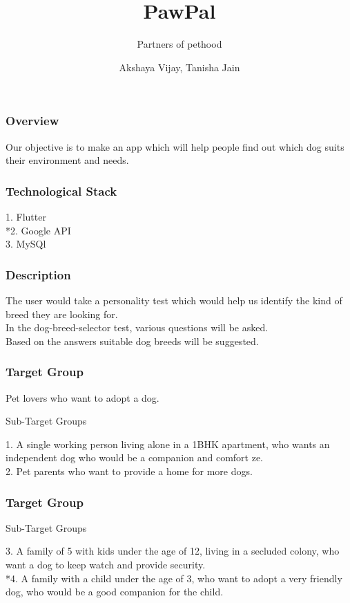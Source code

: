 \documentclass[14pt]{beamer}
\title[Pawpal]{PawPal}
\subtitle[Partners of pethood]{Partners of pethood}
\author[Team 42]{Akshaya Vijay, Tanisha Jain}
\begin{document}
\begin{frame}
    \titlepage
\end{frame}


\begin{frame}
    \frametitle{Overview}
    Our objective is to make an app which will help people find out which dog suits their environment and needs. 
\end{frame}


\begin{frame}
    \frametitle{Technological Stack}
    1. Flutter
    \\*2. Google API
    \\3. MySQl
\end{frame}
   

\begin{frame}
    \frametitle{Description}
    The user would take a personality test which would help us identify the kind of breed they are looking for. 
    \\In the dog-breed-selector test, various questions will be asked. 
    \\Based on the answers suitable dog breeds will be suggested.
\end{frame}


\begin{frame}
    \frametitle{Target Group}
    Pet lovers who want to adopt a dog. 
    
    \begin{block}{Sub-Target Groups}
    \end{block}        

    1. A single working person living alone in a 1BHK apartment, who wants an independent dog who would be a companion and comfort ze.
    \\2. Pet parents who want to provide a home for more dogs.
\end{frame}


\begin{frame}
    \frametitle{Target Group}
    \begin{block}{Sub-Target Groups}
    \end{block}        
    3. A family of 5 with kids under the age of 12, living in a secluded colony, who want a dog to keep watch and provide security. 
    \\*4. A family with a child under the age of 3, who want to adopt a very friendly dog, who would be a good companion for the child.
\end{frame}
\end{document}
